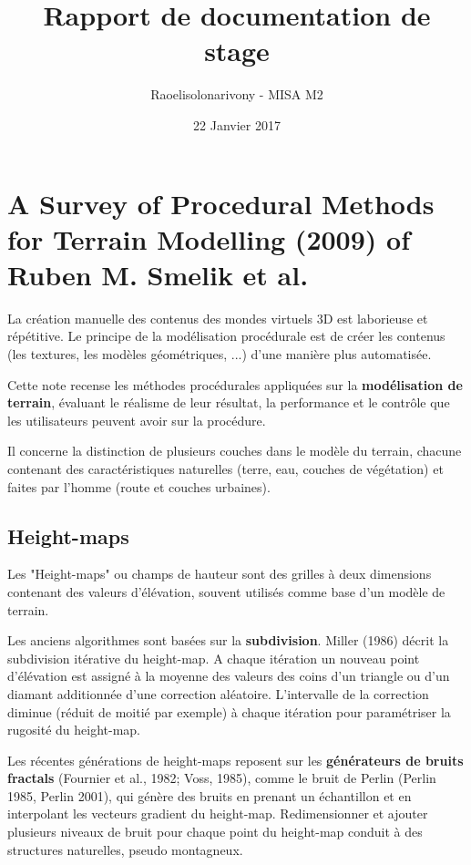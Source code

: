 \documentclass[11pt]{article}
\title{Rapport de documentation de stage}
\author{Raoelisolonarivony - MISA M2}
\date{22 Janvier 2017}
\begin{document}
\maketitle

\section*{A Survey of Procedural Methods for Terrain Modelling (2009) of Ruben M. Smelik et al.}

La création manuelle des contenus des mondes virtuels 3D est laborieuse et répétitive. 
Le principe de la modélisation procédurale est de créer les contenus (les textures, les modèles géométriques, ...) d'une manière plus automatisée.

 Cette note recense les méthodes procédurales appliquées sur la \textbf{modélisation de terrain}, évaluant le réalisme de leur résultat, la performance et le contrôle que les utilisateurs peuvent avoir sur la procédure.

Il concerne la distinction de plusieurs couches dans le modèle du terrain, chacune contenant des caractéristiques naturelles (terre, eau, couches de végétation) et faites par l'homme (route et couches urbaines). 

\subsection*{Height-maps}

Les "Height-maps" ou champs de hauteur sont des grilles à deux dimensions contenant des valeurs d'élévation, souvent utilisés comme base d'un modèle de terrain.

Les anciens algorithmes sont basées sur la \textbf{subdivision}. Miller (1986) décrit la subdivision itérative du height-map. A chaque itération un nouveau point d'élévation est assigné à la moyenne des valeurs des coins d'un triangle ou d'un diamant additionnée d'une correction aléatoire. L'intervalle de la correction diminue (réduit de moitié par exemple) à chaque itération pour paramétriser la rugosité du height-map. 

Les récentes générations de height-maps reposent sur les \textbf{générateurs de bruits fractals} (Fournier et al., 1982; Voss, 1985), comme le bruit de Perlin (Perlin 1985, Perlin 2001), qui génère des bruits en prenant un échantillon et en interpolant les vecteurs gradient du height-map. Redimensionner et ajouter plusieurs niveaux de bruit pour chaque point du height-map conduit à des structures naturelles, pseudo montagneux.
\end{document}
